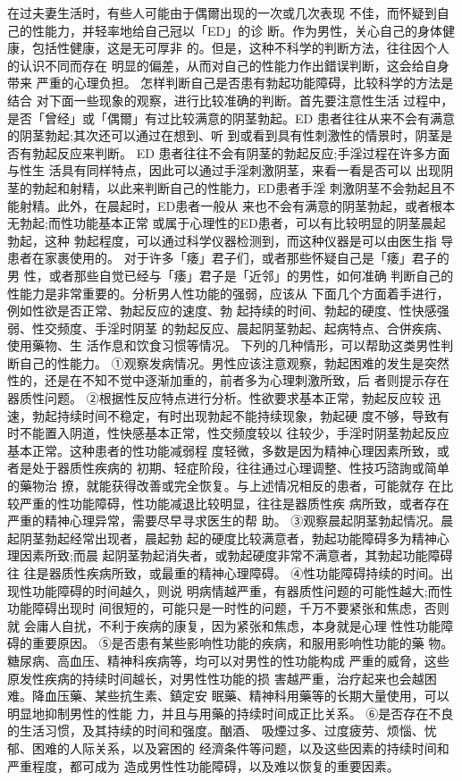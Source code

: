 \documentclass[12pt,UTF8]{ctexbook}
\begin{document}
在过夫妻生活时，有些人可能由于偶爾出现的一次或几次表现
不佳，而怀疑到自己的性能力，并轻率地给自己冠以「ED」的诊
断。作为男性，关心自己的身体健康，包括性健康，这是无可厚非
的。但是，这种不科学的判断方法，往往因个人的认识不同而存在
明显的偏差，从而对自己的性能力作出錯误判断，这会给自身带来
严重的心理负担。
怎样判断自己是否患有勃起功能障碍，比较科学的方法是结合
对下面一些现象的观察，进行比较准确的判断。首先要注意性生活
过程中，是否「曾经」或「偶爾」有过比较满意的阴茎勃起。ED
患者往往从来不会有满意的阴茎勃起;其次还可以通过在想到、听
到或看到具有性刺激性的情景时，阴茎是否有勃起反应来判断。
ED 患者往往不会有阴茎的勃起反应;手淫过程在许多方面与性生
活具有同样特点，因此可以通过手淫刺激阴茎，来看一看是否可以
出现阴茎的勃起和射精，以此来判断自己的性能力，ED患者手淫
刺激阴茎不会勃起且不能射精。此外，在晨起时，ED患者一般从
来也不会有满意的阴茎勃起，或者根本无勃起;而性功能基本正常
或属于心理性的ED患者，可以有比较明显的阴茎晨起勃起，这种
勃起程度，可以通过科学仪器检测到，而这种仪器是可以由医生指
导患者在家裹使用的。
对于许多「痿」君子们，或者那些怀疑自己是「痿」君子的男
性，或者那些自觉已经与「痿」君子是「近邻」的男性，如何准确
判断自己的性能力是非常重要的。分析男人性功能的强弱，应该从
下面几个方面着手进行，例如性欲是否正常、勃起反应的速度、勃
起持续的时间、勃起的硬度、性快感强弱、性交频度、手淫时阴茎
的勃起反应、晨起阴茎勃起、起病特点、合併疾病、使用藥物、生
活作息和饮食习惯等情况。
下列的几种情形，可以帮助这类男性判断自己的性能力。
①观察发病情况。男性应该注意观察，勃起困难的发生是突然
性的，还是在不知不觉中逐渐加重的，前者多为心理刺激所致，后
者则提示存在器质性问题。
②根据性反应特点进行分析。性欲要求基本正常，勃起反应较
迅速，勃起持续时间不稳定，有时出现勃起不能持续现象，勃起硬
度不够，导致有时不能置入阴道，性快感基本正常，性交频度较以
往较少，手淫时阴茎勃起反应基本正常。这种患者的性功能减弱程
度轻微，多数是因为精神心理因素所致，或者是处于器质性疾病的
初期、轻症阶段，往往通过心理调整、性技巧諮詢或简单的藥物治
撩，就能获得改善或完全恢复。与上述情况相反的患者，可能就存
在比较严重的性功能障碍，性功能减退比较明显，往往是器质性疾
病所致，或者存在严重的精神心理异常，需要尽早寻求医生的帮
助。
③观察晨起阴茎勃起情况。晨起阴茎勃起经常出现者，晨起勃
起的硬度比较满意者，勃起功能障碍多为精神心理因素所致;而晨
起阴茎勃起消失者，或勃起硬度非常不满意者，其勃起功能障碍往
往是器质性疾病所致，或最重的精神心理障碍。
④性功能障碍持续的时间。出现性功能障碍的时间越久，则说
明病情越严重，有器质性问题的可能性越大;而性功能障碍出现时
间很短的，可能只是一时性的问题，千万不要紧张和焦虑，否则就
会庸人自扰，不利于疾病的康复，因为紧张和焦虑，本身就是心理
性性功能障碍的重要原因。
⑤是否患有某些影响性功能的疾病，和服用影响性功能的藥
物。糖尿病、高血压、精神科疾病等，均可以对男性的性功能构成
严重的威脅，这些原发性疾病的持续时间越长，对男性性功能的损
害越严重，治疗起来也会越困难。降血压藥、某些抗生素、鎮定安
眠藥、精神科用藥等的长期大量使用，可以明显地抑制男性的性能
力，并且与用藥的持续时间成正比关系。
⑥是否存在不良的生活习惯，及其持续的时间和强度。酗酒、
吸煙过多、过度疲劳、烦惱、忧郁、困难的人际关系，以及窘困的
经濟条件等问题，以及这些因素的持续时间和严重程度，都可成为
造成男性性功能障碍，以及难以恢复的重要因素。
\end{document}
